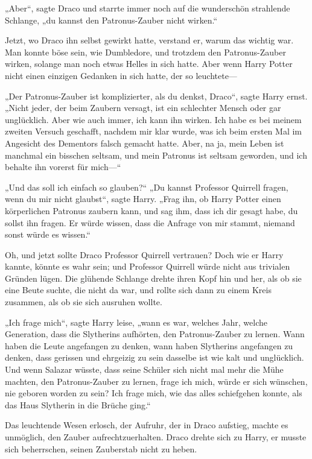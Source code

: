 {„Aber“, sagte Draco und starrte immer noch auf die wunderschön strahlende Schlange, „du kannst den Patronus-Zauber nicht wirken.“

Jetzt, wo Draco ihn selbst gewirkt hatte, verstand er, warum das wichtig war. Man konnte böse sein, wie Dumbledore, und trotzdem den Patronus-Zauber wirken, solange man noch etwas Helles in sich hatte. Aber wenn Harry Potter nicht einen einzigen Gedanken in sich hatte, der so leuchtete—

„Der Patronus-Zauber ist komplizierter, als du denkst, Draco“, sagte Harry ernst. „Nicht jeder, der beim Zaubern versagt, ist ein schlechter Mensch oder gar unglücklich. Aber wie auch immer, ich kann ihn wirken. Ich habe es bei meinem zweiten Versuch geschafft, nachdem mir klar wurde, was ich beim ersten Mal im Angesicht des Dementors falsch gemacht hatte. Aber, na ja, mein Leben ist manchmal ein bisschen seltsam, und mein Patronus ist seltsam geworden, und ich behalte ihn vorerst für mich—“

„Und das soll ich einfach so glauben?“ „Du kannst Professor Quirrell fragen, wenn du mir nicht glaubst“, sagte Harry. „Frag ihn, ob Harry Potter einen körperlichen Patronus zaubern kann, und sag ihm, dass ich dir gesagt habe, du sollst ihn fragen. Er würde wissen, dass die Anfrage von mir stammt, niemand sonst würde es wissen.“

Oh, und jetzt sollte Draco Professor Quirrell vertrauen? Doch wie er Harry kannte, könnte es wahr sein; und Professor Quirrell würde nicht aus trivialen Gründen lügen. Die glühende Schlange drehte ihren Kopf hin und her, als ob sie eine Beute suchte, die nicht da war, und rollte sich dann zu einem Kreis zusammen, als ob sie sich ausruhen wollte.

„Ich frage mich“, sagte Harry leise, „wann es war, welches Jahr, welche Generation, dass die Slytherins aufhörten, den Patronus-Zauber zu lernen. Wann haben die Leute angefangen zu denken, wann haben Slytherins angefangen zu denken, dass gerissen und ehrgeizig zu sein dasselbe ist wie kalt und unglücklich. Und wenn Salazar wüsste, dass seine Schüler sich nicht mal mehr die Mühe machten, den Patronus-Zauber zu lernen, frage ich mich, würde er sich wünschen, nie geboren worden zu sein? Ich frage mich, wie das alles schiefgehen konnte, als das Haus Slytherin in die Brüche ging.“

Das leuchtende Wesen erlosch, der Aufruhr, der in Draco aufstieg, machte es unmöglich, den Zauber aufrechtzuerhalten. Draco drehte sich zu Harry, er musste sich beherrschen, seinen Zauberstab nicht zu heben.

}
